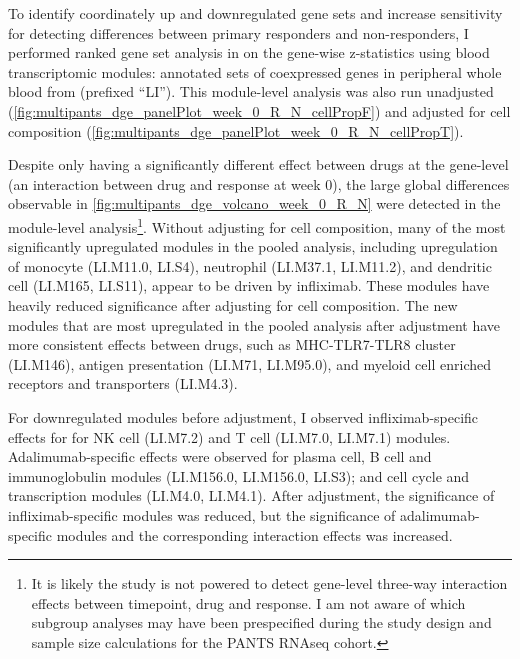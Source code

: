 \begin{outline}
To identify coordinately up and downregulated gene sets and increase sensitivity for detecting differences between primary responders and non-responders,
I performed ranked gene set analysis in on the gene-wise z-statistics using blood transcriptomic modules: annotated sets of coexpressed genes in peripheral whole blood from \textcite{li2013MolecularSignaturesAntibody} (prefixed \enquote{LI}).
This module-level analysis was also run unadjusted (\autoref{fig:multipants_dge_panelPlot_week_0_R_N_cellPropF}) and adjusted for cell composition (\autoref{fig:multipants_dge_panelPlot_week_0_R_N_cellPropT}).

Despite only  having a significantly different effect between drugs at the gene-level (an interaction between drug and response at week 0), 
the large global differences observable in \autoref{fig:multipants_dge_volcano_week_0_R_N} were detected in the module-level analysis\footnote{
It is likely the study is not powered to detect gene-level three-way interaction effects between timepoint, drug and response.
I am not aware of which subgroup analyses may have been prespecified during the study design and sample size calculations for the \gls{PANTS} \gls{RNAseq} cohort.
}.
Without adjusting for cell composition, many of the most significantly upregulated modules in the pooled analysis, 
including upregulation of monocyte (LI.M11.0, LI.S4), neutrophil (LI.M37.1, LI.M11.2), and dendritic cell (LI.M165, LI.S11),
appear to be driven by infliximab.
These modules have heavily reduced significance after adjusting for cell composition.
The new modules that are most upregulated in the pooled analysis after adjustment have more consistent effects between drugs, such as
MHC-TLR7-TLR8 cluster (LI.M146), antigen presentation (LI.M71, LI.M95.0), and myeloid cell enriched receptors and transporters (LI.M4.3).

For downregulated modules before adjustment, I observed infliximab-specific effects for for NK cell (LI.M7.2) and T cell (LI.M7.0, LI.M7.1) modules.
Adalimumab-specific effects were observed for plasma cell, B cell and immunoglobulin modules (LI.M156.0, LI.M156.0, LI.S3); and cell cycle and transcription modules (LI.M4.0, LI.M4.1).
After adjustment, the significance of infliximab-specific modules was reduced, 
but the significance of adalimumab-specific modules and the corresponding interaction effects was increased.


\end{outline}
